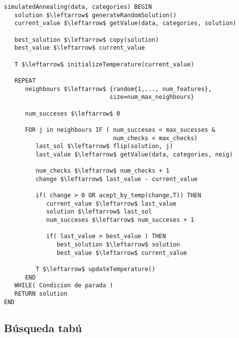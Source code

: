 \documentclass[11pt,leqno]{article}
\begin{document}
	\begin{lstlisting}[mathescape=true]
simulatedAnnealing(data, categories) BEGIN
   solution $\leftarrow$ generateRandomSolution()
   current_value $\leftarrow$ getValue(data, categories, solution)
   
   best_solution $\leftarrow$ copy(solution)
   best_value $\leftarrow$ current_value
   
   T $\leftarrow$ initializeTemperature(current_value)
	
   REPEAT
      neighbours $\leftarrow$ {random{1,..., num_features}, 
                              size=num_max_neighbours}
                              
	  num_succeses $\leftarrow$ 0
	  
      FOR j in neighbours IF ( num_succeses < max_sucesses &
                               num_checks < max_checks)
         last_sol $\leftarrow$ flip(solution, j)
         last_value $\leftarrow$ getValue(data, categories, neig)
         
         num_checks $\leftarrow$ num_checks + 1
         change $\leftarrow$ last_value - current_value
         
         if( change > 0 OR acept_by_temp(change,T)) THEN
            current_value $\leftarrow$ last_value
            solution $\leftarrow$ last_sol
            num_succeses $\leftarrow$ num_succeses + 1
            
            if( last_value > best_value ) THEN
               best_solution $\leftarrow$ solution
               best_value $\leftarrow$ current_value
          
         T $\leftarrow$ updateTemperature()
      END
   WHILE( Condicion de parada )
   RETURN solution
END
	\end{lstlisting}
	
	
\subsection{Búsqueda tabú}
\end{document}

